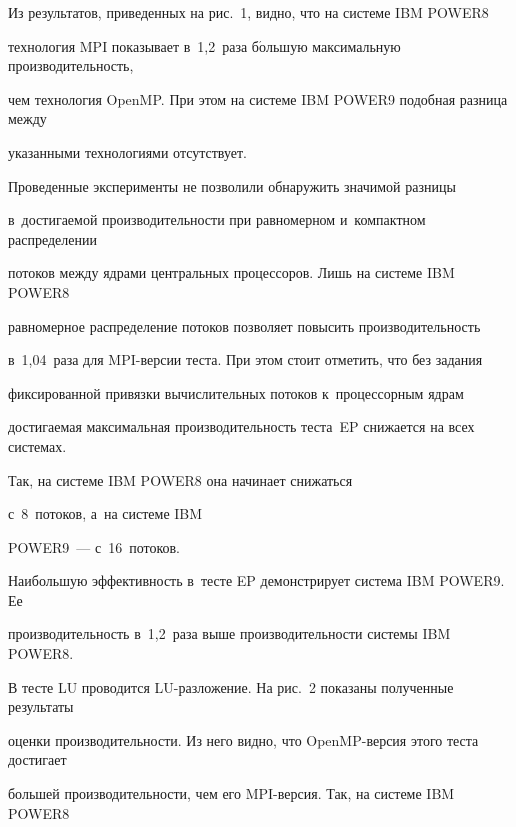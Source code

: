 Из результатов, приведенных на рис.~1, видно, что на системе IBM POWER8 


технология MPI показывает в~1,2~раза б$\acute{\mbox{о}}$льшую максимальную производительность, 


чем технология \mbox{OpenMP}. При этом на системе IBM \mbox{POWER9} подобная разница между 


указанными технологиями отсутствует.





Проведенные эксперименты не позволили обнаружить значимой разницы 


в~достигаемой производительности при равномерном и~компактном распределении 


потоков между ядрами центральных процессоров. Лишь на системе IBM \mbox{POWER8} 


равномерное распределение потоков позволяет повысить производительность 


в~1,04~раза для MPI-вер\-сии тес\-та. При этом стоит отметить, что без задания 


фиксированной привязки вычислительных потоков к~процессорным ядрам 


достигаемая максимальная производительность теста~EP снижается на всех системах. 


Так, на системе IBM \mbox{POWER8} она начинает снижаться 


с~8~по\-то\-ков,  а~на системе IBM 


\mbox{POWER9}~--- с~16~по\-то\-ков. 









Наибольшую эффективность в~тесте EP демонстрирует система IBM \mbox{POWER9}. Ее 


производительность в~1,2~раза выше производительности сис\-те\-мы IBM \mbox{POWER8}.





В тесте LU проводится LU-разложение. На рис.~2 показаны полученные результаты 


оценки производительности. Из него видно, что \mbox{OpenMP}-вер\-сия этого теста достигает 


большей производительности, чем его MPI-вер\-сия. Так, на системе IBM \mbox{POWER8} 


